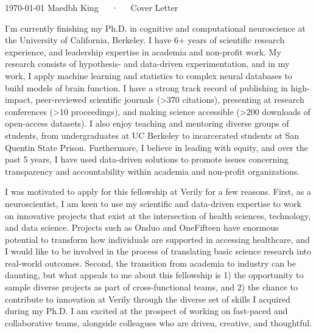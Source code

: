 \documentclass[9pt, a4paper]{maedbh-cv}
\begin{document}
\makecvheader[R]

\makecvfooter
  {\today}
  {Maedbh King~~~·~~~Cover Letter}
  {}
  
\makelettertitle

\begin{cvletter}

I'm currently finishing my Ph.D. in cognitive and computational neuroscience at the University of California, Berkeley. I have 6+ years of scientific research experience, and leadership expertise in academia and non-profit work. My research consists of hypothesis- and data-driven experimentation, and in my work, I apply machine learning and statistics to complex neural databases to build models of brain function. I have a strong track record of publishing in high-impact, peer-reviewed scientific journals (>370 citations), presenting at research conferences (>10 proceedings), and making science accessible (>200 downloads of open-access datasets). I also enjoy teaching and mentoring diverse groups of students, from undergraduates at UC Berkeley to incarcerated students at San Quentin State Prison. Furthermore, I believe in leading with equity, and over the past 5 years, I have used data-driven solutions to promote issues concerning transparency and accountability within academia and non-profit organizations. 

I was motivated to apply for this fellowship at Verily for a few reasons. First, as a neuroscientist, I am keen to use my scientific and data-driven expertise to work on innovative projects that exist at the intersection of health sciences, technology, and data science. Projects such as Onduo and OneFifteen have enormous potential to transform how individuals are supported in accessing healthcare, and I would like to be involved in the process of translating basic science research into real-world outcomes. Second, the transition from academia to industry can be daunting, but what appeals to me about this fellowship is 1) the opportunity to sample diverse projects as part of cross-functional teams, and 2) the chance to contribute to innovation at Verily through the diverse set of skills I acquired during my Ph.D. I am excited at the prospect of working on fast-paced and collaborative teams, alongside colleagues who are driven, creative, and thoughtful. 


\end{cvletter}
\end{document}
